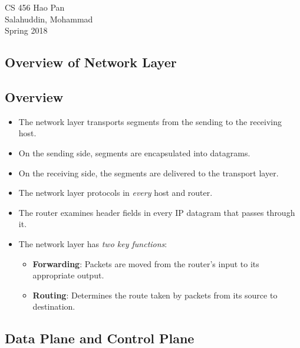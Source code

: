 \documentclass{article}
\begin{document}
\noindent
{CS 456 \hfill Hao Pan}\\
{Salahuddin, Mohammad}\\
{Spring 2018}


\begin{center}
\section{Overview of Network Layer}
\noindent
\end{center}

\subsection{Overview}

\begin{itemize}
\item The network layer transports segments from the sending to the receiving host.
\item On the sending side, segments are encapsulated into datagrams.
\item On the receiving side, the segments are delivered to the transport layer.
\item The network layer protocols in \emph{every} host and router.
\item The router examines header fields in every IP datagram that passes through it.
\item The network layer has \emph{two key functions}:
\begin{itemize}
\item {\bf Forwarding}: Packets are moved from the router's input to its appropriate output.
\item {\bf Routing}: Determines the route taken by packets from its source to destination.
\end{itemize}
\end{itemize}

\subsection{Data Plane and Control Plane}
\end{document}
